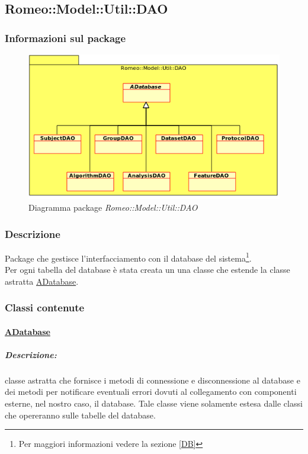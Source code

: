 	\subsection{Romeo::Model::Util::DAO}
	\label{romeo::model::util::dao}
		\subsubsection{Informazioni sul package}
		\label{info_dao}
		\begin{figure}[!h]
			\centering
			\includegraphics[width=\linewidth]{./Content/Immagini/DAO.png}
			\caption{Diagramma package \textsl{Romeo::Model::Util::DAO}}
			\label{comp_romeo::model::util::dao}
		\end{figure}
		\subsubsection{Descrizione}
		\label{descr_dao}
		Package\glossario{} che gestisce l'interfacciamento con il database del sistema\footnote{Per maggiori informazioni vedere la sezione \ref{DB}}.
		\\Per ogni tabella del database è stata creata un una classe che estende la classe astratta \hyperref[dao::adatabase]{ADatabase}.
		
		\subsubsection{Classi contenute}
		\paragraph{\underline{ADatabase}}
		\label{dao::adatabase} 
		
			\subparagraph{Descrizione:} classe astratta che fornisce i metodi di connessione e disconnessione al database e dei metodi per notificare eventuali errori dovuti al collegamento con componenti esterne, nel nostro caso, il database. Tale classe viene solamente estesa dalle classi che opereranno sulle tabelle del database.
			
